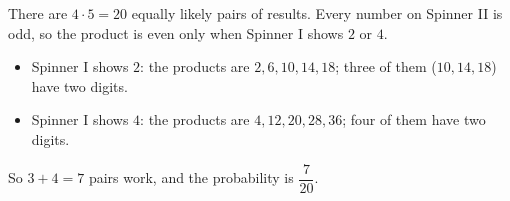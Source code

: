 There are $4\cdot5=20$ equally likely pairs of results. Every number on Spinner II is odd, so the product is even only when Spinner I shows $2$ or $4$.
\begin{itemize}
\item Spinner I shows $2$: the products are $2,6,10,14,18$; three of them ($10,14,18$) have two digits.
\item Spinner I shows $4$: the products are $4,12,20,28,36$; four of them have two digits.
\end{itemize}
So $3+4=7$ pairs work, and the probability is $\boxed{\dfrac{7}{20}}$.
